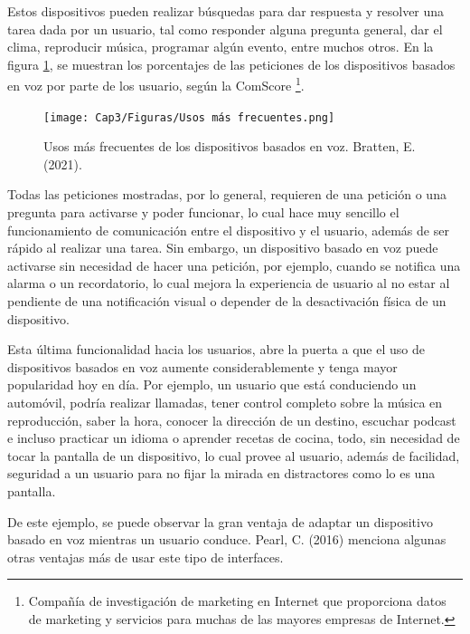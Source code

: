 Estos dispositivos pueden realizar búsquedas para dar respuesta y resolver una tarea dada por un usuario, tal como responder alguna pregunta general, dar el clima, reproducir música, programar algún evento, entre muchos otros. En la figura \ref{fig:32}, se muestran los porcentajes de las peticiones de los dispositivos basados en voz por parte de los usuario, según la ComScore \footnote{Compañía de investigación de marketing en Internet que proporciona datos de marketing y servicios para muchas de las mayores empresas de Internet.}.

\begin{figure}[H]
  \centering
  \texttt{[image: Cap3/Figuras/Usos más frecuentes.png]}
  \caption{Usos más frecuentes de los dispositivos basados en voz. Bratten, E. (2021).}
  \label{fig:32}
\end{figure}

Todas las peticiones mostradas, por lo general, requieren de una petición o una pregunta para activarse y poder funcionar, lo cual hace muy sencillo el funcionamiento de comunicación entre el dispositivo y el usuario, además de ser rápido al realizar una tarea. Sin embargo, un dispositivo basado en voz puede activarse sin necesidad de hacer una petición, por ejemplo, cuando se notifica una alarma o un recordatorio, lo cual mejora la experiencia de usuario al no estar al pendiente de una notificación visual o depender de la desactivación física de un dispositivo.

Esta última funcionalidad hacia los usuarios, abre la puerta a que el uso de dispositivos basados en voz aumente considerablemente y tenga mayor popularidad hoy en día. Por ejemplo, un usuario que está conduciendo un automóvil, podría realizar llamadas, tener control completo sobre la música en reproducción, saber la hora, conocer la dirección de un destino, escuchar podcast e incluso practicar un idioma o aprender recetas de cocina, todo, sin necesidad de tocar la pantalla de un dispositivo, lo cual provee al usuario, además de facilidad, seguridad a un usuario para no fijar la mirada en distractores como lo es una pantalla.

De este ejemplo, se puede observar la gran ventaja de adaptar un dispositivo basado en voz mientras un usuario conduce. Pearl, C. (2016) menciona algunas otras ventajas más de usar este tipo de interfaces.


